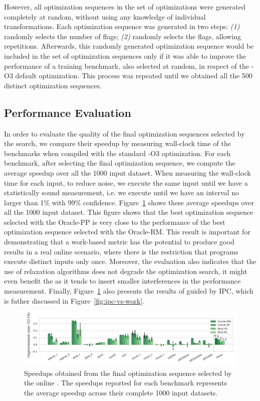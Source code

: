 However, all optimization sequences in the set of optimizations were generated completely at random, without using any knowledge of individual transformations.
Each optimization sequence was generated in two steps: \textit{(1)} randomly selects the number of flags; \textit{(2)} randomly selects the flags, allowing repetitions.
Afterwards, this randomly generated optimization sequence would be included in the set of optimization sequences only if it was able to improve the performance of a training benchmark, also selected at random, in respect of the {\flagstype -O3} default optimization.
This process was repeated until we obtained all the 500 distinct optimization sequences.

\subsection{Performance Evaluation}

In order to evaluate the quality of the final optimization sequences selected by the {\itercomp} search, we compare their speedup by measuring wall-clock time of the benchmarks when compiled with the standard {\flagstype -O3} optimization.
For each benchmark, after selecting the final optimization sequence, we compute the average speedup over all the 1000 input dataset.
When measuring the wall-clock time for each input, to reduce noise, we execute the same input until we have a statistically sound measurement, i.e. we execute until we have an interval no larger than 1\% with 99\% confidence.
Figure~\ref{fig:speedups} shows these average speedups over all the 1000 input dataset.
This figure shows that the best optimization sequence selected with the Oracle-PP is very close to the performance of the best optimization sequence selected with the Oracle-RM.
This result is important for demonstrating that a work-based metric has the potential to produce good results in a real online scenario, where there is the restriction that programs execute distinct inputs only once.
Moreover, the evaluation also indicates that the use of relaxation algorithms does not degrade the optimization search,
it might even benefit the {\itercomp} as it tends to insert smaller interferences in the performance measurement.
Finally, Figure~\ref{fig:speedups} also presents the results of {\itercomp} guided by IPC, which is futher discussed in Figure~\ref{fig:ipc-vs-work}.

\begin{figure}[htb]
    \centering
    \includegraphics[width=\textwidth]{figs/speedups.pdf}
    \caption{Speedups obtained from the final optimization sequence selected by the online {\itercomp}.
	         The speedups reported for each benchmark represents the average speedup across their complete 1000 input datasets.}
    \label{fig:speedups}
\end{figure}

